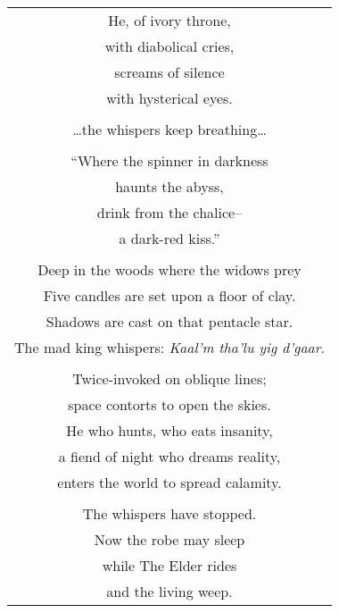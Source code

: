 \documentclass{article}
\begin{document}
\begin{center}
\begin{tabular}{c}
\\
He, of ivory throne, \\
with diabolical cries, \\
screams of silence \\
with hysterical eyes. \\
\\
\ldots{}the whispers keep breathing\ldots{} \\
\\
``Where the spinner in darkness \\
haunts the abyss, \\
drink from the chalice-- \\
a dark-red kiss.'' \\
\\
Deep in the woods where the widows prey \\
Five candles are set upon a floor of clay. \\
Shadows are cast on that pentacle star. \\
The mad king whispers: \textit{Kaal'm tha'lu yig d'gaar}. \\
\\
Twice-invoked on oblique lines; \\
space contorts to open the skies. \\
He who hunts, who eats insanity, \\
a fiend of night who dreams reality, \\
enters the world to spread calamity. \\
\\
The whispers have stopped. \\
Now the robe may sleep \\
while The Elder rides \\
and the living weep. \\
\end{tabular}
\end{center}
\end{document}
